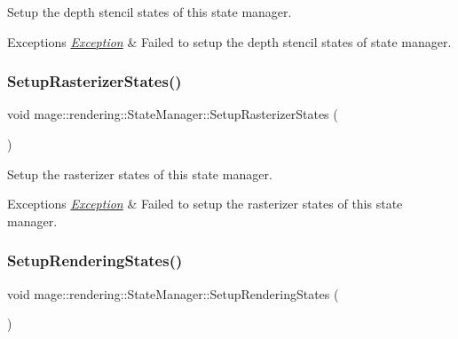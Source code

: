 Setup the depth stencil states of this state manager.


\begin{DoxyExceptions}{Exceptions}
{\em \hyperlink{classmage_1_1_exception}{Exception}} & Failed to setup the depth stencil states of state manager. \\
\hline
\end{DoxyExceptions}
\hypertarget{classmage_1_1rendering_1_1_state_manager_a6cee7878db58409e6527d84de1bec5c8}{}\label{classmage_1_1rendering_1_1_state_manager_a6cee7878db58409e6527d84de1bec5c8} 
\subsubsection{\texorpdfstring{Setup\+Rasterizer\+States()}{SetupRasterizerStates()}}
{\footnotesize\ttfamily void mage\+::rendering\+::\+State\+Manager\+::\+Setup\+Rasterizer\+States (\begin{DoxyParamCaption}{ }\end{DoxyParamCaption})\hspace{0.3cm}{\ttfamily [private]}}

Setup the rasterizer states of this state manager.


\begin{DoxyExceptions}{Exceptions}
{\em \hyperlink{classmage_1_1_exception}{Exception}} & Failed to setup the rasterizer states of this state manager. \\
\hline
\end{DoxyExceptions}
\hypertarget{classmage_1_1rendering_1_1_state_manager_ac2da3d4e04b0ef43e286e4661bca8deb}{}\label{classmage_1_1rendering_1_1_state_manager_ac2da3d4e04b0ef43e286e4661bca8deb} 
\subsubsection{\texorpdfstring{Setup\+Rendering\+States()}{SetupRenderingStates()}}
{\footnotesize\ttfamily void mage\+::rendering\+::\+State\+Manager\+::\+Setup\+Rendering\+States (\begin{DoxyParamCaption}{ }\end{DoxyParamCaption})\hspace{0.3cm}{\ttfamily [private]}}

